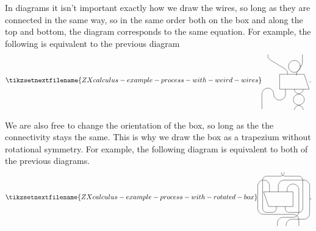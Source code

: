 \documentclass[fleqn]{NotesClass}
\begin{document}
    In diagrams it isn't important exactly how we draw the wires, so long as they are connected in the same way, so in the same order both on the box and along the top and bottom, the diagram corresponds to the same equation.
    For example, the following is equivalent to the previous diagram
    \begin{equation}
        \tikzsetnextfilename{ZXcalculus-example-process-with-weird-wires}
        \begin{tikzpicture}[baseline=(current bounding box)]
            \draw (0, 0) -- ++ (1.5, 0) -- ++ (-0.25, 0.75) -- ++ (-1.25, 0) -- cycle;
            \draw (0.3, 0) -- ++ (0, -0.25) arc (0:-180:0.3) arc (0:180:0.3) -- ++ (0, -0.75);
            \draw[rounded corners] (0.75, 0) -- ++ (0, -0.15) -- ++ (0.5, -0.2) -- ++ (0, -0.35) -- ++ (-0.5, -0.2) -- ++ (0, -0.15);
            \draw[rounded corners] (1.2, 0) -- ++ (0, -0.15) -- ++ (-0.5, -0.2) -- ++ (0, -0.35) -- ++ (0.5, -0.2) -- ++ (0, -0.15);
            \draw[rounded corners] (0.4, 0.75) -- ++ (0, 0.2) -- ++ (-1, 0.6) -- ++ (0, 0.2);
            \draw[rounded corners] (0.85, 0.75) -- ++ (0, 0.1) -- ++ (0.2, 0.2) -- ++ (0, 0.1) coordinate (A);
            \draw (A) arc (0:330:0.3) coordinate (B);
            \draw[rounded corners] (B) -- ++ (0.15, 0.25) -- ++ (0, 0.5);
        \end{tikzpicture}
        .
    \end{equation}
    
    We are also free to change the orientation of the box, so long as the the connectivity stays the same.
    This is why we draw the box as a trapezium without rotational symmetry.
    For example, the following diagram is equivalent to both of the previous diagrams.
    \begin{equation}
        \tikzsetnextfilename{ZXcalculus-example-process-with-rotated-box}
        \begin{tikzpicture}[baseline=(current bounding box)]
            \draw (0, 0) -- ++ (-0.25, 0.75) -- ++ (1.5, 0) -- ++ (0, -0.75) -- cycle;
            \draw (0.05, 0.75) -- ++ (0, 0.3) arc (0:180:0.3) -- ++ (0, -1.15) arc (180:270:0.3) -- ++ (1.5, 0) arc (90:0:0.3) -- ++ (0, -0.3);
            \draw (0.5, 0.75) -- ++ (0, 0.3) arc (180:90:0.3) -- ++ (1, 0) arc (90:0:0.3) -- ++ (0, -1.4) arc (0:-90:0.3) -- ++ (-0.6, 0) arc (90:180:0.3) -- ++ (0, -0.05);
            \draw (0.95, 0.75) -- ++ (0, 0.1) arc (180:0:0.3) -- ++ (0, -1.1) arc (0:-90:0.3) -- ++ (-0.5, 0) arc (90:180:0.3) -- ++ (0, -0.15);
            \draw (0.4, 0) -- ++ (0, -0.1) arc (0:-90:0.2) -- ++ (-0.3, 0) arc (270:180:0.2) -- ++ (0, 1.45) arc (180:90:0.2) -- ++ (0.7, 0) arc (-90:0:0.2);
            \draw (0.85, 0) -- ++ (0, -0.1) arc (180:270:0.2) -- ++ (0.5, 0) arc (-90:0:0.2) -- ++ (0, 1.45) arc (0:90:0.2) -- ++ (-0.7, 0) arc (270:180:0.2);
        \end{tikzpicture}
        .
    \end{equation}
\end{document}
